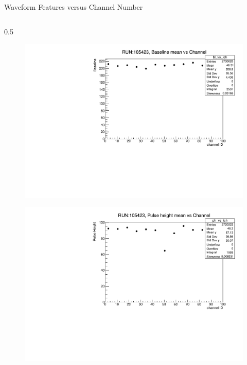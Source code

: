 \documentclass{beamer}[10pt]
\begin{document}
\begin{frame}{Waveform Features versus Channel Number}
\begin{columns}
\begin{column}{0.5\framewidth}
\begin{figure}[H]
   \centering
   \includegraphics[width= .90\columnwidth]{figures/pdf/bl_vs_ch.pdf}
   \label{fig:wffytl}
 \end{figure}
\vspace{-8mm}
\begin{figure}[H]
   \centering
   \includegraphics[width= .90\columnwidth]{figures/pdf/ph_vs_ch.pdf}
   \label{fig:wffytl}
 \end{figure}
\end{column}
\end{columns}
\end{frame}
\end{document}
